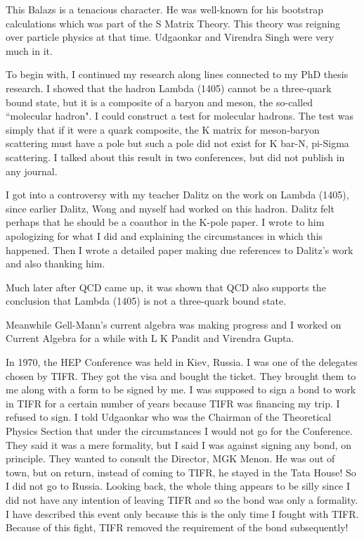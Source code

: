 This Balazs is a tenacious character. He was well-known for his 
bootstrap calculations which was part of the S Matrix Theory. This 
theory was reigning over particle physics at that time. Udgaonkar and 
Virendra Singh were very much in it.

To begin with, I continued my research along lines connected to my PhD 
thesis research. I showed that the hadron Lambda (1405) cannot be a 
three-quark bound state, but it is a composite of a baryon and meson, 
the so-called ``molecular hadron". I could construct a test for molecular 
hadrons. The test was simply that if it were a quark composite, the K 
matrix for meson-baryon scattering must have a pole but such a pole did 
not exist for K bar-N, pi-Sigma scattering. I talked about this result 
in two conferences, but did not publish in any journal.

I got into a controversy with my teacher Dalitz on the work on Lambda 
(1405), since earlier Dalitz, Wong and myself had worked on this hadron. 
Dalitz felt perhaps that he should be a coauthor in the K-pole paper. I 
wrote to him apologizing for what I did and explaining the circumstances 
in which this happened. Then I wrote a detailed paper making due 
references to Dalitz's work and also thanking him.

Much later after QCD came up, it was shown that QCD also supports the 
conclusion that Lambda (1405) is not a three-quark bound state.

Meanwhile Gell-Mann's current algebra was making progress and I worked 
on Current Algebra for a while with L K Pandit and Virendra Gupta.

In 1970, the HEP Conference was held in Kiev, Russia. I was one of the 
delegates chosen by TIFR. They got the visa and bought the ticket. They 
brought them to me along with a form to be signed by me. I was supposed 
to sign a bond to work in TIFR for a certain number of years because 
TIFR was financing my trip. I refused to sign. I told Udgaonkar who was 
the Chairman of the Theoretical Physics Section that under the 
circumstances I would not go for the Conference. They said it was a mere 
formality, but I said I was against signing any bond, on principle. They 
wanted to consult the Director, MGK Menon. He was out of town, but on 
return, instead of coming to TIFR, he stayed in the Tata House! So I did 
not go to Russia. Looking back, the whole thing appears to be silly 
since I did not have any intention of leaving TIFR and so the bond was 
only a formality. I have described this event only because this is the 
only time I fought with TIFR. Because of this fight, TIFR removed the 
requirement of the bond subsequently!
\smallskip

